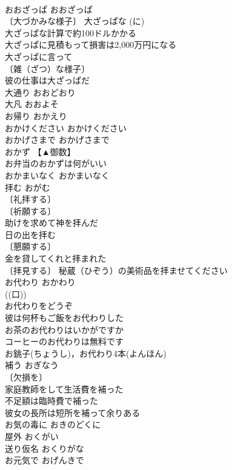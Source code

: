 \documentclass[8pt]{extreport}
\begin{document}
\begin{CJK}{UTF8}{min}
\\	おおざっぱ	おおざっぱ	
\\	〔大づかみな様子〕 大ざっぱな (に) 
\\	大ざっぱな計算で約100ドルかかる 
\\	大ざっぱに見積もって損害は2,000万円になる 
\\	大ざっぱに言って 
\\	〔雑（ざつ）な様子〕
\\	彼の仕事は大ざっぱだ 
\\	大通り	おおどおり	
\\	大凡	おおよそ	
\\	お帰り	おかえり	
\\	おかけください	おかけください	
\\	おかげさまで	おかげさまで	
\\	おかず	【▲御数】	
\\	お弁当のおかずは何がいい 
\\	おかまいなく	おかまいなく	
\\	拝む	おがむ	
\\	〔礼拝する〕
\\	〔祈願する〕
\\	助けを求めて神を拝んだ 
\\	日の出を拝む 
\\	〔懇願する〕
\\	金を貸してくれと拝まれた 
\\	〔拝見する〕 秘蔵（ひぞう）の美術品を拝ませてください 
\\	お代わり	おかわり	
\\	((口)) 
\\	お代わりをどうぞ 
\\	彼は何杯もご飯をお代わりした 
\\	お茶のお代わりはいかがですか 
\\	コーヒーのお代わりは無料です 
\\	お銚子(ちょうし)，お代わり4本(よんほん) 
\\	補う	おぎなう	
\\	〔欠損を〕
\\	家庭教師をして生活費を補った 
\\	不足額は臨時費で補った 
\\	彼女の長所は短所を補って余りある 
\\	お気の毒に	おきのどくに	
\\	屋外	おくがい	
\\	送り仮名	おくりがな	
\\	お元気で	おげんきで	

\end{CJK}
\end{document}
